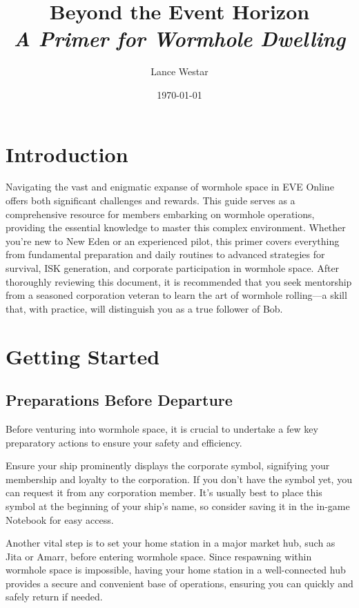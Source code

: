 \documentclass[a4paper,12pt]{article}
\title{Beyond the Event Horizon\\ \textit{\large A Primer for Wormhole Dwelling}}
\author{Lance Westar}
\date{\today}
\begin{document}
\maketitle

\tableofcontents
\newpage

\section{Introduction}

Navigating the vast and enigmatic expanse of wormhole space in EVE Online offers both significant challenges and rewards. This guide serves as a comprehensive resource for members embarking on wormhole operations, providing the essential knowledge to master this complex environment. Whether you're new to New Eden or an experienced pilot, this primer covers everything from fundamental preparation and daily routines to advanced strategies for survival, ISK generation, and corporate participation in wormhole space. After thoroughly reviewing this document, it is recommended that you seek mentorship from a seasoned corporation veteran to learn the art of wormhole rolling—a skill that, with practice, will distinguish you as a true follower of Bob.

\section{Getting Started}

\subsection{Preparations Before Departure}

Before venturing into wormhole space, it is crucial to undertake a few key preparatory actions to ensure your safety and efficiency.

Ensure your ship prominently displays the corporate symbol, signifying your membership and loyalty to the corporation. If you don't have the symbol yet, you can request it from any corporation member. It's usually best to place this symbol at the beginning of your ship's name, so consider saving it in the in-game Notebook for easy access.

Another vital step is to set your home station in a major market hub, such as Jita or Amarr, before entering wormhole space. Since respawning within wormhole space is impossible, having your home station in a well-connected hub provides a secure and convenient base of operations, ensuring you can quickly and safely return if needed.
\end{document}
